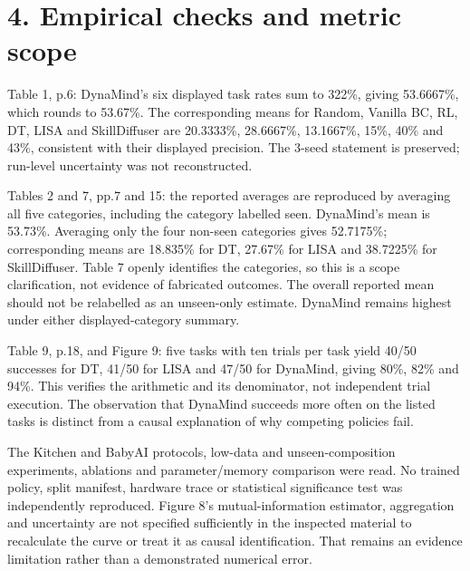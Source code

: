 \documentclass[10pt]{article}
\begin{document}
\section*{4. Empirical checks and metric scope}
Table 1, p.6: DynaMind’s six displayed task rates sum to 322\%, giving 53.6667\%, which rounds to 53.67\%. The corresponding means for Random, Vanilla BC, RL, DT, LISA and SkillDiffuser are 20.3333\%, 28.6667\%, 13.1667\%, 15\%, 40\% and 43\%, consistent with their displayed precision. The 3-seed statement is preserved; run-level uncertainty was not reconstructed.\par
Tables 2 and 7, pp.7 and 15: the reported averages are reproduced by averaging all five categories, including the category labelled seen. DynaMind’s mean is 53.73\%. Averaging only the four non-seen categories gives 52.7175\%; corresponding means are 18.835\% for DT, 27.67\% for LISA and 38.7225\% for SkillDiffuser. Table 7 openly identifies the categories, so this is a scope clarification, not evidence of fabricated outcomes. The overall reported mean should not be relabelled as an unseen-only estimate. DynaMind remains highest under either displayed-category summary.\par
Table 9, p.18, and Figure 9: five tasks with ten trials per task yield 40/50 successes for DT, 41/50 for LISA and 47/50 for DynaMind, giving 80\%, 82\% and 94\%. This verifies the arithmetic and its denominator, not independent trial execution. The observation that DynaMind succeeds more often on the listed tasks is distinct from a causal explanation of why competing policies fail.\par
The Kitchen and BabyAI protocols, low-data and unseen-composition experiments, ablations and parameter/memory comparison were read. No trained policy, split manifest, hardware trace or statistical significance test was independently reproduced. Figure 8’s mutual-information estimator, aggregation and uncertainty are not specified sufficiently in the inspected material to recalculate the curve or treat it as causal identification. That remains an evidence limitation rather than a demonstrated numerical error.\par
\end{document}
